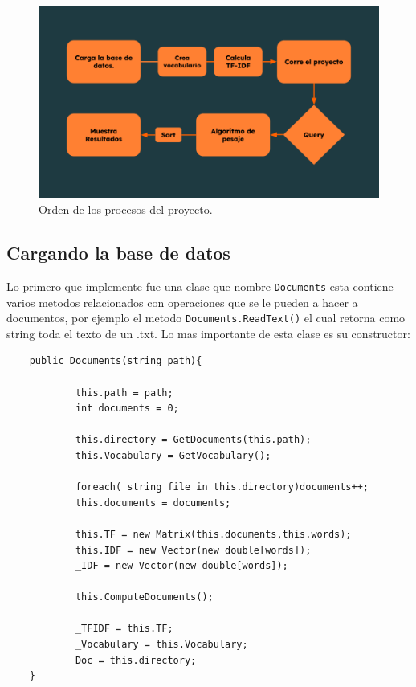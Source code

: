 \documentclass[10pt,a4paper]{report}
\begin{document}
\begin{figure}[h]
    \includegraphics[width = 1\linewidth]{Project.png}
    \caption{Orden de los procesos del proyecto.}
\end{figure}

\subsection{Cargando la base de datos}

\begin{flushleft}

    Lo primero que implemente fue una clase que nombre \texttt{Documents} esta contiene varios metodos relacionados con operaciones que se le pueden a hacer a documentos, por ejemplo el metodo \texttt{Documents.ReadText()} el cual retorna como string toda el texto de un .txt. Lo mas importante de esta clase es su constructor:

\end{flushleft}

\begin{verbatim}
	public Documents(string path){

            this.path = path;
            int documents = 0;
            
            this.directory = GetDocuments(this.path);
            this.Vocabulary = GetVocabulary();
            
            foreach( string file in this.directory)documents++;
            this.documents = documents;
            
            this.TF = new Matrix(this.documents,this.words);
            this.IDF = new Vector(new double[words]);
            _IDF = new Vector(new double[words]);

            this.ComputeDocuments();

            _TFIDF = this.TF;
            _Vocabulary = this.Vocabulary;
            Doc = this.directory;
	}
\end{verbatim}
\end{document}
